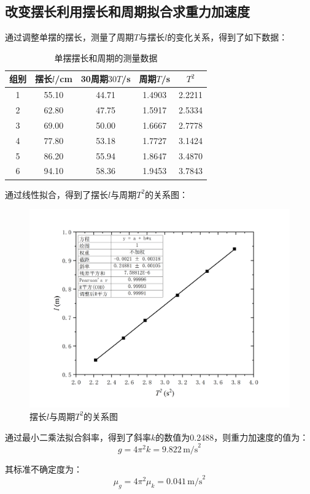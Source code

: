 \documentclass[a4paper]{extarticle}
\begin{document}
    \subsection{改变摆长利用摆长和周期拟合求重力加速度}
    \hspace{2em}
    通过调整单摆的摆长，测量了周期$T$与摆长$l$的变化关系，得到了如下数据：
    \begin{table}[H]
        \centering
        \caption{单摆摆长和周期的测量数据}
        \begin{tabular}{ccccc}
            \toprule
            组别&摆长$l$/cm&30周期$30T$/s&周期$T$/s&$T^2$\\
            \midrule
            1&55.10&44.71&1.4903&2.2211\\
            2&62.80&47.75&1.5917&2.5334\\
            3&69.00&50.00&1.6667&2.7778\\
            4&77.80&53.18&1.7727&3.1424\\
            5&86.20&55.94&1.8647&3.4870\\
            6&94.10&58.36&1.9453&3.7843\\
            \bottomrule
        \end{tabular}
    \end{table}
    \par\hspace{2em}
    通过线性拟合，得到了摆长$l$与周期$T^2$的关系图：
    \begin{figure}[H]
        \centering
        \includegraphics[width=\linewidth]{1.png}
        \caption{摆长$l$与周期$T^2$的关系图}
    \end{figure}
    \par\hspace{2em}
    通过最小二乘法拟合斜率，得到了斜率$k$的数值为0.2488，则重力加速度的值为：
    \begin{equation*}
        g=4\pi^2k=9.822\,\text{m/s}^2
    \end{equation*}
    \par\hspace{2em}
    其标准不确定度为：
    \begin{equation*}
        \mu_g=4\pi^2\mu_k=0.041\,\text{m/s}^2
    \end{equation*}
\end{document}
